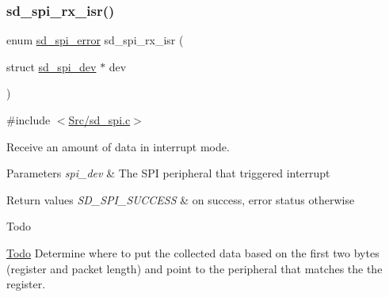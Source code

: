 \subsubsection{\texorpdfstring{sd\+\_\+spi\+\_\+rx\+\_\+isr()}{sd\_spi\_rx\_isr()}}
{\footnotesize\ttfamily enum \mbox{\hyperlink{group___s_d___s_p_i___types_ga9ae67f7089a8196e9c6b74b8a6708c2e}{sd\+\_\+spi\+\_\+error}} sd\+\_\+spi\+\_\+rx\+\_\+isr (\begin{DoxyParamCaption}\item[{struct \mbox{\hyperlink{structsd__spi__dev}{sd\+\_\+spi\+\_\+dev}} $\ast$}]{dev }\end{DoxyParamCaption})\hspace{0.3cm}{\ttfamily [static]}}



{\ttfamily \#include $<$\mbox{\hyperlink{sd__spi_8c}{Src/sd\+\_\+spi.\+c}}$>$}



Receive an amount of data in interrupt mode. 


\begin{DoxyParams}{Parameters}
{\em spi\+\_\+dev} & The S\+PI peripheral that triggered interrupt \\
\hline
\end{DoxyParams}

\begin{DoxyRetVals}{Return values}
{\em S\+D\+\_\+\+S\+P\+I\+\_\+\+S\+U\+C\+C\+E\+SS} & on success, error status otherwise \\
\hline
\end{DoxyRetVals}
\begin{DoxyRefDesc}{Todo}
\item[\mbox{\hyperlink{todo__todo000002}{Todo}}]Determine where to put the collected data based on the first two bytes (register and packet length) and point to the peripheral that matches the the register. \end{DoxyRefDesc}

